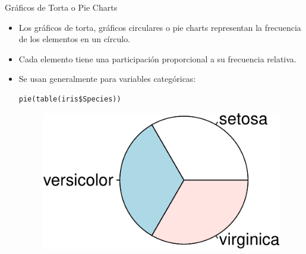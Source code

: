 \documentclass[handout]{beamer}
\begin{document}
\begin{frame}[fragile]{Gráficos de Torta o Pie Charts }
\scriptsize{
\begin{itemize}
 \item Los gráficos de torta, gráficos circulares o pie charts representan la frecuencia de los elementos en un círculo.
 \item Cada elemento tiene una participación proporcional a su frecuencia relativa.
 \item Se usan generalmente para variables categóricas:
 \begin{verbatim}
pie(table(iris$Species))
 \end{verbatim}
 \begin{figure}[h!]
	\centering
	\includegraphics[scale=0.6]{pics/piechart.pdf}
	
	
\end{figure} 

\end{itemize}




}
\end{frame}
\end{document}
